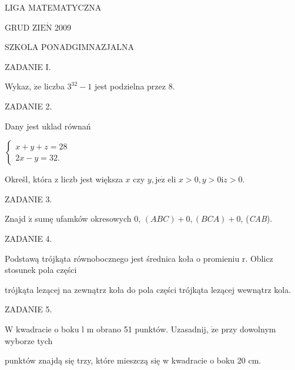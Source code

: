 \documentclass[a4paper,12pt]{article}
\begin{document}
LIGA MATEMATYCZNA

GRUD Z$\mathrm{I}\mathrm{E}\acute{\mathrm{N}}$ 2009

SZKOLA PONADGIMNAZJALNA

ZADANIE I.

Wykaz, $\dot{\mathrm{z}}\mathrm{e}$ liczba $3^{32}-1$ jest podzielna przez 8.

ZADANIE 2.

Dany jest uklad równań

$\left\{\begin{array}{l}
x+y+z=28\\
2x-y=32.
\end{array}\right.$

Okrešl, która z liczb jest większa $x$ czy $y, \mathrm{j}\mathrm{e}\dot{\mathrm{z}}$ eli $x>0, y>0\mathrm{i}z>0.$

ZADANIE 3.

Znajd $\acute{\mathrm{z}}$ sumę ufamków okresowych 0, $(ABC)+0, (BCA)+0$, ({\it CAB}).

ZADANIE 4.

Podstawą trójkąta równobocznego jest średnica koła o promieniu r. Oblicz stosunek pola części

trójkąta lezącej na zewnątrz koła do pola części trójkąta lezącej wewnątrz kola.

ZADANIE 5.

$\mathrm{W}$ kwadracie o boku l $\mathrm{m}$ obrano 51 punktów. Uzasadnij, $\dot{\mathrm{z}}\mathrm{e}$ przy dowolnym wyborze tych

punktów znajdą się trzy, które mieszczą się w kwadracie o boku 20 cm.
\end{document}
